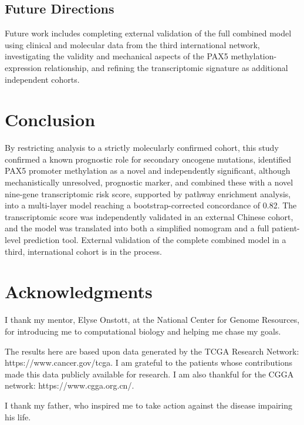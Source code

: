 \documentclass[11pt, letterpaper]{article}
\begin{document}
\subsection{Future Directions}

Future work includes completing external validation of the full combined model using clinical and molecular data from the third international network, investigating the validity and mechanical aspects of the PAX5 methylation-expression relationship, and refining the transcriptomic signature as additional independent cohorts.

\section{Conclusion}

By restricting analysis to a strictly molecularly confirmed cohort, this study confirmed a known prognostic role for secondary oncogene mutations, identified PAX5 promoter methylation as a novel and independently significant, although mechanistically unresolved, prognostic marker, and combined these with a novel nine-gene transcriptomic risk score, supported by pathway enrichment analysis, into a multi-layer model reaching a bootstrap-corrected concordance of 0.82. The transcriptomic score was independently validated in an external Chinese cohort, and the model was translated into both a simplified nomogram and a full patient-level prediction tool. External validation of the complete combined model in a third, international cohort is in the process.

\section*{Acknowledgments}

I thank my mentor, Elyse Onstott, at the National Center for Genome Resources, 
for introducing me to computational biology and helping me chase my goals.

The results here are based upon data generated by the TCGA Research Network: https://www.cancer.gov/tcga. I am grateful to the patients whose contributions made this data publicly available for research. I am also thankful for the CGGA network: https://www.cgga.org.cn/.

I thank my father, who inspired me to take action against the disease impairing his life.
\end{document}
